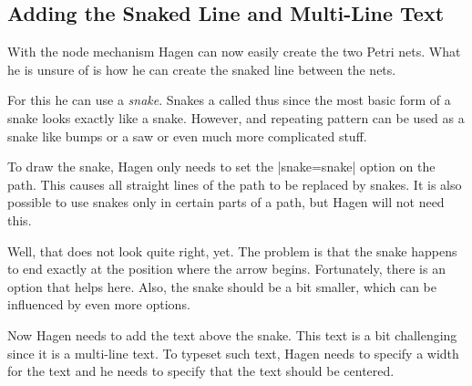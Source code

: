 \subsection{Adding the Snaked Line and Multi-Line Text}

With the node mechanism Hagen can now easily create the two Petri
nets. What he is unsure of is how he can create the snaked line
between the nets.

For this he can use a \emph{snake}. Snakes a called thus since the
most basic form of a snake looks exactly like a snake. However, and
repeating pattern can be used as a snake like bumps or a saw or even
much more complicated stuff.

To draw the snake, Hagen only needs to set the |snake=snake| option on
the path. This causes all straight lines of the path to be replaced by
snakes. It is also possible to use snakes only in certain parts of a
path, but Hagen will not need this.

\begin{codeexample}[]
\end{codeexample}

Well, that does not look quite right, yet. The problem is that the
snake happens to end exactly at the position where the arrow
begins. Fortunately, there is an option that helps here. Also, the
snake should be a bit smaller, which can be influenced by even more
options. 

\begin{codeexample}[]
\end{codeexample}

Now Hagen needs to add the text above the snake. This text is a bit
challenging since it is a multi-line text. To typeset such text, Hagen
needs to specify a width for the text and he needs to specify that the
text should be centered.


\begin{codeexample}[]
\end{codeexample}



